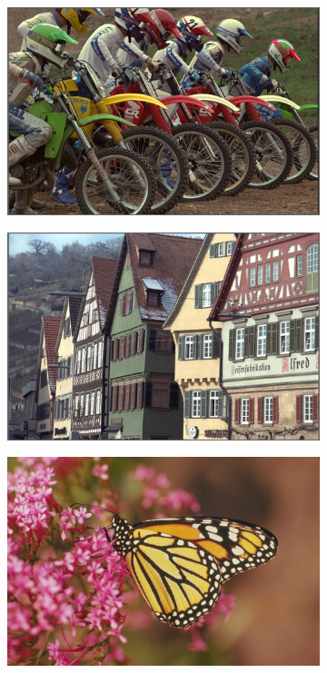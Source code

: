 \begin{figure}[H]
    \centering
    \begin{subfigure}[b]{0.4\textwidth}
        \center
        \includegraphics[width=\textwidth]{Figs/Implementation/bikes.pdf}
        \caption{}\label{fig:}
    \end{subfigure}
    \begin{subfigure}[b]{0.4\textwidth}
        \center
        \includegraphics[width=\textwidth]{Figs/Implementation/buildings.pdf}
        \caption{}\label{fig:}
    \end{subfigure}
    \begin{subfigure}[b]{0.4\textwidth}
        \center
        \includegraphics[width=\textwidth]{Figs/Implementation/monarch.pdf}

\end{subfigure}
\end{figure}
